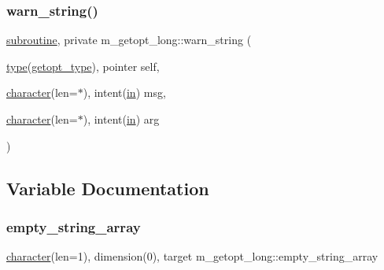 \mbox{\label{namespacem__getopt__long_a78f4dacb7eae96d7e259544003ae0dfd}} 
\subsubsection{\texorpdfstring{warn\+\_\+string()}{warn\_string()}}
{\footnotesize\ttfamily \hyperlink{M__stopwatch_83_8txt_acfbcff50169d691ff02d4a123ed70482}{subroutine}, private m\+\_\+getopt\+\_\+long\+::warn\+\_\+string (\begin{DoxyParamCaption}\item[{\hyperlink{stop__watch_83_8txt_a70f0ead91c32e25323c03265aa302c1c}{type}(\hyperlink{structm__getopt__long_1_1getopt__type}{getopt\+\_\+type}), pointer}]{self,  }\item[{\hyperlink{option__stopwatch_83_8txt_abd4b21fbbd175834027b5224bfe97e66}{character}(len=$\ast$), intent(\hyperlink{M__journal_83_8txt_afce72651d1eed785a2132bee863b2f38}{in})}]{msg,  }\item[{\hyperlink{option__stopwatch_83_8txt_abd4b21fbbd175834027b5224bfe97e66}{character}(len=$\ast$), intent(\hyperlink{M__journal_83_8txt_afce72651d1eed785a2132bee863b2f38}{in})}]{arg }\end{DoxyParamCaption})\hspace{0.3cm}{\ttfamily [private]}}



\subsection{Variable Documentation}
\mbox{\label{namespacem__getopt__long_a6f74fcf9d3fc08c69e4df052af120051}} 
\subsubsection{\texorpdfstring{empty\+\_\+string\+\_\+array}{empty\_string\_array}}
{\footnotesize\ttfamily \hyperlink{option__stopwatch_83_8txt_abd4b21fbbd175834027b5224bfe97e66}{character}(len=1), dimension(0), target m\+\_\+getopt\+\_\+long\+::empty\+\_\+string\+\_\+array}

